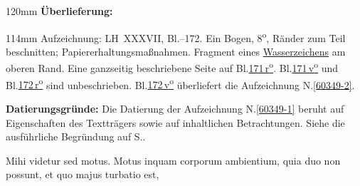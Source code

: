 %
\frenchspacing%
\begin{ledgroupsized}[r]{120mm}%
\footnotesize%
\pstart%
\noindent\textbf{Überlieferung:}%
\pend%
\end{ledgroupsized}%
\begin{ledgroupsized}[r]{114mm}%
\footnotesize%
\pstart%
\parindent -6mm%
%
Aufzeichnung:
LH~XXXVII, Bl.--172.
Ein Bogen, 8\textsuperscript{o},
Ränder zum Teil beschnitten;
Papiererhaltungsmaßnahmen.
Fragment eines \href{\Scan{LH_37_05_171-172wz}}{Wasserzeichens} am oberen Rand.
Eine ganzseitig beschriebene Seite auf Bl.\;\href{\Scan{LH_37_05_171r}}{171\,r\textsuperscript{o}}.
Bl.\;\href{\Scan{LH_37_05_171v}}{171\,v\textsuperscript{o}} und
Bl.\;\href{\Scan{LH_37_05_172r}}{172\,r\textsuperscript{o}} sind unbeschrieben.
Bl.\;\href{\Scan{LH_37_05_172v}}{172\,v\textsuperscript{o}} überliefert die Aufzeichnung N.\;\ref{60349-2}.
\pend%
\end{ledgroupsized}%
\vspace{5mm}%
\begin{ledgroup}%
\footnotesize%
\pstart%
\noindent%
\textbf{Datierungsgründe:}
Die Datierung der Aufzeichnung N.\;\ref{60349-1} beruht auf Eigenschaften des Textträgers sowie auf inhaltlichen Betrachtungen.
Siehe die ausführliche Begründung auf S.\;\pageref{60349-1_dat}.%
\pend%
\end{ledgroup}%
%
\frenchspacing%
\vspace{8mm}%
\normalsize%
\pstart%
\noindent%
Mihi videtur
sed motus.%
Motus inquam corporum ambientium,%
%
quia duo
non possunt,
et quo majus turbatio est,%

